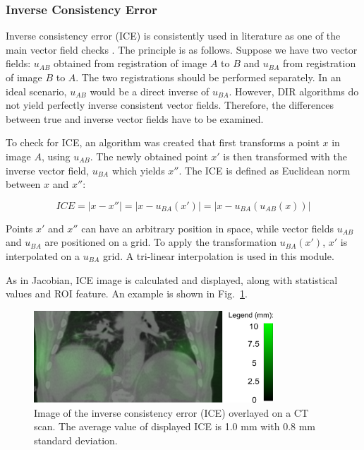 \documentclass[type=dr, dr=rernat, accentcolor=tud7b,colorbacktitle, bigchapter, openright, twoside, 12pt ]{tudthesis}
\begin{document}
\subsubsection{Inverse Consistency Error}
\label{ICE}

Inverse consistency error (ICE) is consistently used in literature as one of the main vector field checks \cite{Christensen2001, Bender2009}. The principle is as follows. Suppose we have two vector fields: $u_{AB}$ obtained from registration of image $A$ to $B$ and $u_{BA}$ from registration of image $B$ to $A$. The two registrations
should be performed separately. In an ideal scenario, $u_{AB}$ would be a direct inverse of $u_{BA}$. However, DIR algorithms do not yield perfectly inverse consistent vector fields. Therefore, the differences between true and inverse vector fields have to be examined.


To check for ICE, an algorithm was created that first transforms a point $x$ in image $A$, using $u_{AB}$. The newly obtained point $x'$ is then transformed with the inverse vector
field, $u_{BA}$ which yields $x''$. The ICE is defined as Euclidean norm between $x$ and $x''$:

\begin{equation}
\label{eq:ice}
ICE = |x - x''| = |x - u_{BA}(x')| = |x - u_{BA}(u_{AB}(x))|
\end{equation}

Points $x'$ and $x''$ can have an arbitrary position in space, while vector fields $u_{AB}$ and $u_{BA}$ are positioned on a grid. To apply the transformation $u_{BA}(x')$, $x'$ is interpolated on a $u_{BA}$ grid. A tri-linear interpolation is used in this module.

As in Jacobian, ICE image is calculated and displayed, along with statistical values and ROI feature. An example is shown in Fig.~\ref{inv}.




\begin{figure}[H]
\begin{center}
\includegraphics[width=0.8\textwidth]{./Images/inv.png}
\caption{Image of the inverse consistency error (ICE) overlayed on a CT scan. The average value of displayed ICE is 1.0 mm with 0.8 mm standard deviation.}
\label{inv}
\end{center}
\end{figure}
\end{document}
